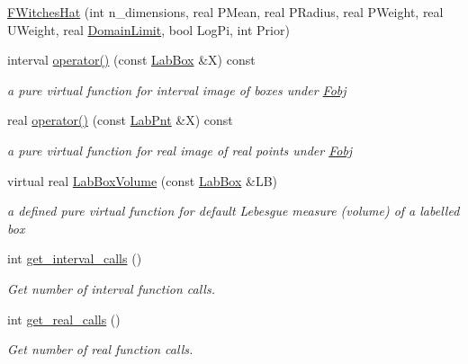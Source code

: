 \begin{DoxyCompactItemize}
\item 
\hyperlink{classFWitchesHat_aab1cf526334362a4902d3a724190f038}{\-F\-Witches\-Hat} (int n\-\_\-dimensions, real \-P\-Mean, real \-P\-Radius, real \-P\-Weight, real \-U\-Weight, real \hyperlink{LevyFobj2D_8cpp_ae28a2599911ae746bc33211d3ea52aaf}{\-Domain\-Limit}, bool \-Log\-Pi, int \-Prior)
\item 
interval \hyperlink{classFWitchesHat_a11734772d7dea57df5ff72ebbfd3e272}{operator()} (const \hyperlink{classLabBox}{\-Lab\-Box} \&\-X) const 
\begin{DoxyCompactList}\small\item\em a pure virtual function for interval image of boxes under \hyperlink{classFobj}{\-Fobj} \end{DoxyCompactList}\item 
real \hyperlink{classFWitchesHat_a027d78c3e9e90da19370cb50d8b43b46}{operator()} (const \hyperlink{classLabPnt}{\-Lab\-Pnt} \&\-X) const 
\begin{DoxyCompactList}\small\item\em a pure virtual function for real image of real points under \hyperlink{classFobj}{\-Fobj} \end{DoxyCompactList}\item 
virtual real \hyperlink{classFWitchesHat_a4549cc1c30758e673f050e9b30eae67e}{\-Lab\-Box\-Volume} (const \hyperlink{classLabBox}{\-Lab\-Box} \&\-L\-B)
\begin{DoxyCompactList}\small\item\em a defined pure virtual function for default \-Lebesgue measure (volume) of a labelled box \end{DoxyCompactList}\item 
int \hyperlink{classFWitchesHat_ac5039f4bf8564b17e2c5c3fcbd10ddfd}{get\-\_\-interval\-\_\-calls} ()
\begin{DoxyCompactList}\small\item\em \-Get number of interval function calls. \end{DoxyCompactList}\item 
int \hyperlink{classFWitchesHat_a601c966b9479f0d500f677ab1756347f}{get\-\_\-real\-\_\-calls} ()
\begin{DoxyCompactList}\small\item\em \-Get number of real function calls. \end{DoxyCompactList}\end{DoxyCompactItemize}
